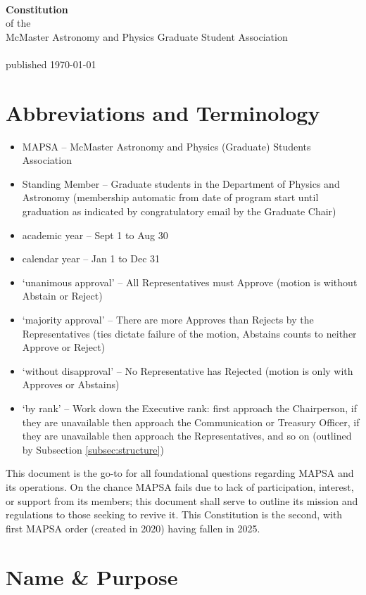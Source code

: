 \documentclass[8pt]{article}
\begin{document}
	~
	\vspace{4in}
	\begin{center}
		\textbf{\Huge{Constitution}}\\\normalsize{of the}\\McMaster Astronomy and Physics Graduate Student Association\\~\\
		published \today
	\end{center}
	\vfill
	
	\pagebreak
	\tableofcontents	
	\section*{Abbreviations and Terminology}
	\begin{itemize}
	\item MAPSA -- McMaster Astronomy and Physics (Graduate) Students Association
	\item Standing Member -- Graduate students in the Department of Physics and Astronomy (membership automatic from date of program start until graduation as indicated by congratulatory email by the Graduate Chair) 
	\item academic year -- Sept 1 to Aug 30
	\item calendar year -- Jan 1 to Dec 31
	\item `unanimous approval' -- All Representatives must Approve (motion is without Abstain or Reject)
	\item `majority approval' -- There are more Approves than Rejects by the Representatives (ties dictate failure of the motion, Abstains counts to neither Approve or Reject)
	\item `without disapproval' -- No Representative has Rejected (motion is only with Approves or Abstains)
	\item `by rank' -- Work down the Executive rank: first approach the Chairperson, if they are unavailable then approach the Communication or Treasury Officer, if they are unavailable then approach the Representatives, and so on (outlined by Subsection \ref{subsec:structure})
	\end{itemize}
	This document is the go-to for all foundational questions regarding MAPSA and its operations. On the chance MAPSA fails due to lack of participation, interest, or support from its members; this document shall serve to outline its mission and regulations to those seeking to revive it. This Constitution is the second, with first MAPSA order (created in 2020) having fallen in 2025.
	\section{Name \& Purpose}
\end{document}
